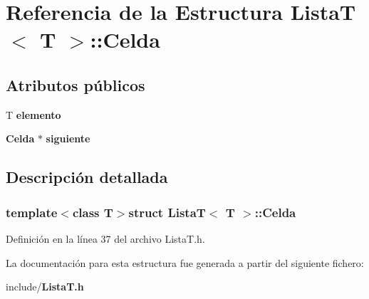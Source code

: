 \section{Referencia de la Estructura Lista\-T$<$ T $>$\-:\-:Celda}
\label{structListaT_1_1Celda}
\subsection*{Atributos públicos}
\begin{DoxyCompactItemize}
\item 
T {\bfseries elemento}\label{structListaT_1_1Celda_a298f1853939e248d84a06458a607829b}

\item 
{\bf Celda} $\ast$ {\bfseries siguiente}\label{structListaT_1_1Celda_a36e5f237f7e7a8bc7414cdd6293da7d3}

\end{DoxyCompactItemize}


\subsection{Descripción detallada}
\subsubsection*{template$<$class T$>$struct Lista\-T$<$ T $>$\-::\-Celda}



Definición en la línea 37 del archivo Lista\-T.\-h.



La documentación para esta estructura fue generada a partir del siguiente fichero\-:\begin{DoxyCompactItemize}
\item 
include/{\bf Lista\-T.\-h}\end{DoxyCompactItemize}
